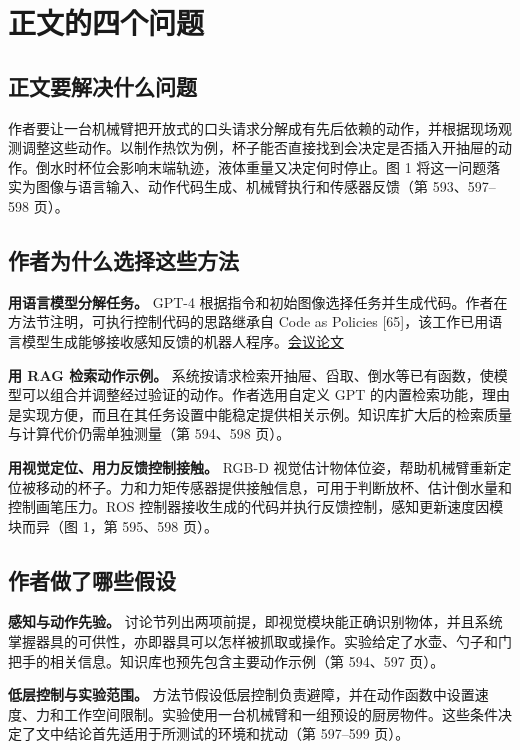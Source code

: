 \documentclass[UTF8,11pt,a4paper,twoside,fontset=none,heading=false]{ctexart}
\begin{document}
\section{正文的四个问题}

\subsection{正文要解决什么问题}

作者要让一台机械臂把开放式的口头请求分解成有先后依赖的动作，并根据现场观测调整这些动作。以制作热饮为例，杯子能否直接找到会决定是否插入开抽屉的动作。倒水时杯位会影响末端轨迹，液体重量又决定何时停止。图 1 将这一问题落实为图像与语言输入、动作代码生成、机械臂执行和传感器反馈（第 593、597--598 页）。

\subsection{作者为什么选择这些方法}

\textbf{用语言模型分解任务。} GPT-4 根据指令和初始图像选择任务并生成代码。作者在方法节注明，可执行控制代码的思路继承自 Code as Policies {[}65{]}，该工作已用语言模型生成能够接收感知反馈的机器人程序。\href{https://ieeexplore.ieee.org/abstract/document/10160591/}{会议论文}

\textbf{用 RAG 检索动作示例。} 系统按请求检索开抽屉、舀取、倒水等已有函数，使模型可以组合并调整经过验证的动作。作者选用自定义 GPT 的内置检索功能，理由是实现方便，而且在其任务设置中能稳定提供相关示例。知识库扩大后的检索质量与计算代价仍需单独测量（第 594、598 页）。

\textbf{用视觉定位、用力反馈控制接触。} RGB-D 视觉估计物体位姿，帮助机械臂重新定位被移动的杯子。力和力矩传感器提供接触信息，可用于判断放杯、估计倒水量和控制画笔压力。ROS 控制器接收生成的代码并执行反馈控制，感知更新速度因模块而异（图 1，第 595、598 页）。

\subsection{作者做了哪些假设}

\textbf{感知与动作先验。} 讨论节列出两项前提，即视觉模块能正确识别物体，并且系统掌握器具的可供性，亦即器具可以怎样被抓取或操作。实验给定了水壶、勺子和门把手的相关信息。知识库也预先包含主要动作示例（第 594、597 页）。

\textbf{低层控制与实验范围。} 方法节假设低层控制负责避障，并在动作函数中设置速度、力和工作空间限制。实验使用一台机械臂和一组预设的厨房物件。这些条件决定了文中结论首先适用于所测试的环境和扰动（第 597--599 页）。
\end{document}
